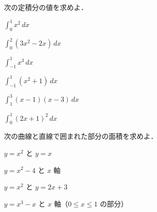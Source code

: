 \documentclass[lualatex,paper=b5j,fontsize=10pt,twoside]{jlreq}
\begin{document}
\begin{msanswerstrip}
\end{msanswerstrip}



次の定積分の値を求めよ．

\begin{msdrill}
  \item $\displaystyle\int_{0}^{1}x^2\,dx$
  \item $\displaystyle\int_{0}^{2}(3x^2-2x)\,dx$
  \item $\displaystyle\int_{-1}^{1}x^3\,dx$
  \item $\displaystyle\int_{-1}^{1}(x^2+1)\,dx$
  \item $\displaystyle\int_{1}^{3}(x-1)(x-3)\,dx$
  \item $\displaystyle\int_{0}^{1}(2x+1)^2\,dx$
\end{msdrill}

\begin{msanswerstrip}
\end{msanswerstrip}



次の曲線と直線で囲まれた部分の面積を求めよ．

\begin{msdrill}
  \item $y=x^2$ と $y=x$
  \item $y=x^2-4$ と $x$ 軸
  \item $y=x^2$ と $y=2x+3$
  \item $y=x^3-x$ と $x$ 軸（$0\leq x\leq 1$ の部分）
\end{msdrill}

\begin{msanswerstrip}
\end{msanswerstrip}
\end{document}

